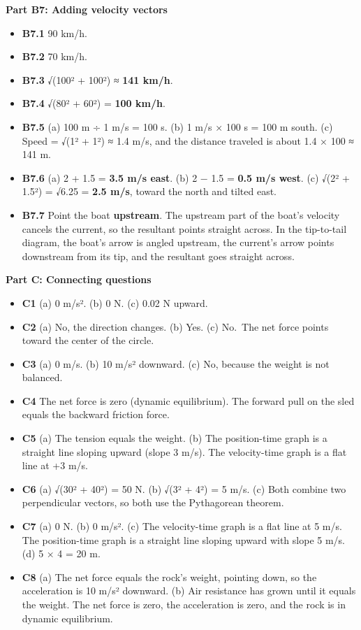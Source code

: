 \documentclass[
]{article}
\providecommand{\tightlist}{%
  \setlength{\itemsep}{0pt}\setlength{\parskip}{0pt}}
\begin{document}
\textbf{Part B7: Adding velocity vectors}

\begin{itemize}
\tightlist
\item
  \textbf{B7.1} 90 km/h.
\item
  \textbf{B7.2} 70 km/h.
\item
  \textbf{B7.3} √(100² + 100²) ≈ \textbf{141 km/h}.
\item
  \textbf{B7.4} √(80² + 60²) = \textbf{100 km/h}.
\item
  \textbf{B7.5} (a) 100 m ÷ 1 m/s = 100 s. (b) 1 m/s × 100 s = 100 m
  south. (c) Speed = √(1² + 1²) ≈ 1.4 m/s, and the distance traveled is
  about 1.4 × 100 ≈ 141 m.
\item
  \textbf{B7.6} (a) 2 + 1.5 = \textbf{3.5 m/s east}. (b) 2 − 1.5 =
  \textbf{0.5 m/s west}. (c) √(2² + 1.5²) = √6.25 = \textbf{2.5 m/s},
  toward the north and tilted east.
\item
  \textbf{B7.7} Point the boat \textbf{upstream}. The upstream part of
  the boat's velocity cancels the current, so the resultant points
  straight across. In the tip-to-tail diagram, the boat's arrow is
  angled upstream, the current's arrow points downstream from its tip,
  and the resultant goes straight across.
\end{itemize}

\textbf{Part C: Connecting questions}

\begin{itemize}
\tightlist
\item
  \textbf{C1} (a) 0 m/s². (b) 0 N. (c) 0.02 N upward.
\item
  \textbf{C2} (a) No, the direction changes. (b) Yes. (c) No.~The net
  force points toward the center of the circle.
\item
  \textbf{C3} (a) 0 m/s. (b) 10 m/s² downward. (c) No, because the
  weight is not balanced.
\item
  \textbf{C4} The net force is zero (dynamic equilibrium). The forward
  pull on the sled equals the backward friction force.
\item
  \textbf{C5} (a) The tension equals the weight. (b) The position-time
  graph is a straight line sloping upward (slope 3 m/s). The
  velocity-time graph is a flat line at +3 m/s.
\item
  \textbf{C6} (a) √(30² + 40²) = 50 N. (b) √(3² + 4²) = 5 m/s. (c) Both
  combine two perpendicular vectors, so both use the Pythagorean
  theorem.
\item
  \textbf{C7} (a) 0 N. (b) 0 m/s². (c) The velocity-time graph is a flat
  line at 5 m/s. The position-time graph is a straight line sloping
  upward with slope 5 m/s. (d) 5 × 4 = 20 m.
\item
  \textbf{C8} (a) The net force equals the rock's weight, pointing down,
  so the acceleration is 10 m/s² downward. (b) Air resistance has grown
  until it equals the weight. The net force is zero, the acceleration is
  zero, and the rock is in dynamic equilibrium.
\end{itemize}
\end{document}
